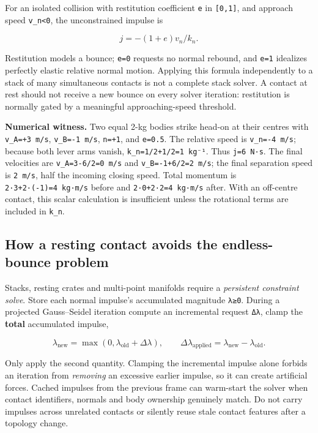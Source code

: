 For an isolated collision with restitution coefficient \texttt{e} in \texttt{{[}0,1{]}}, and approach speed \texttt{v\_n\textless{}0}, the unconstrained impulse is

\[
j=-(1+e)v_n/k_n.
\]

Restitution models a bounce; \texttt{e=0} requests no normal rebound, and \texttt{e=1} idealizes perfectly elastic relative normal motion. Applying this formula independently to a stack of many simultaneous contacts is not a complete stack solver. A contact at rest should not receive a new bounce on every solver iteration: restitution is normally gated by a meaningful approaching-speed threshold.

\textbf{Numerical witness.} Two equal 2-kg bodies strike head-on at their centres with \texttt{v\_A=+3\ m/s}, \texttt{v\_B=-1\ m/s}, \texttt{n=+1}, and \texttt{e=0.5}. The relative speed is \texttt{v\_n=-4\ m/s}; because both lever arms vanish, \texttt{k\_n=1/2+1/2=1\ kg⁻¹}. Thus \texttt{j=6\ N·s}. The final velocities are \texttt{v\textquotesingle{}\_A=3-6/2=0\ m/s} and \texttt{v\textquotesingle{}\_B=-1+6/2=2\ m/s}; the final separation speed is \texttt{2\ m/s}, half the incoming closing speed. Total momentum is \texttt{2·3+2·(-1)=4\ kg·m/s} before and \texttt{2·0+2·2=4\ kg·m/s} after. With an off-centre contact, this scalar calculation is insufficient unless the rotational terms are included in \texttt{k\_n}.

\subsection{How a resting contact avoids the endless-bounce problem}\label{02-foundations-ii-ch039-how-a-resting-contact-avoids-the-endless-bounce-problem}

Stacks, resting crates and multi-point manifolds require a \emph{persistent constraint solve}. Store each normal impulse's accumulated magnitude \texttt{λ≥0}. During a projected Gauss--Seidel iteration compute an incremental request \texttt{Δλ}, clamp the \textbf{total} accumulated impulse,

\[
\lambda_{\mathrm{new}}=\max(0,\lambda_{\mathrm{old}}+\Delta\lambda),\qquad
\Delta\lambda_{\mathrm{applied}}=\lambda_{\mathrm{new}}-\lambda_{\mathrm{old}}.
\]

Only apply the second quantity. Clamping the incremental impulse alone forbids an iteration from \emph{removing} an excessive earlier impulse, so it can create artificial forces. Cached impulses from the previous frame can warm-start the solver when contact identifiers, normals and body ownership genuinely match. Do not carry impulses across unrelated contacts or silently reuse stale contact features after a topology change.

